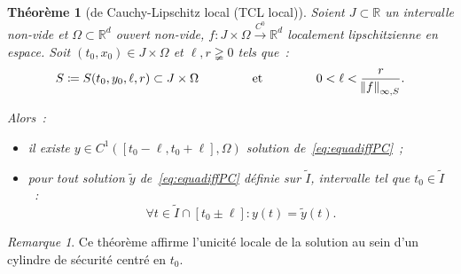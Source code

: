\documentclass{report}
\newtheorem{thm}{Théorème}[chapter]
\theoremstyle{definition}
\theoremstyle{remark}
\newtheorem*{rmq}{Remarque}
\numberwithin{equation}{section}
\newcommand{\R}{\mathbb R}
\newcommand{\toC}[1]{\xrightarrow{C^{#1}}}
\newcommand{\tocont}{\toC 0}
\begin{document}
			\begin{thm}[de Cauchy-Lipschitz local (TCL local)]Soient $J \subset \R$ un intervalle non-vide et $\Omega \subset \R^d$ ouvert non-vide,
			$f : J \times \Omega \tocont \R^d$ localement lipschitzienne en espace. Soit $(t_0, x_0) \in J \times \Omega$ et $\ell, r \gneqq 0$ tels que~:
			\begin{equation}
				S \coloneqq S(t_0, y_0, \ell, r) \subset J \times \Omega\qquad\qquad\text{ et }\qquad\qquad0 < \ell < \frac r{\norm f_{\infty, S}}.
			\end{equation}

			Alors~:
			\begin{itemize}
				\item il existe $y \in C^1\left([t_0-\ell, t_0+\ell], \Omega\right)$ solution de~\eqref{eq:equadiffPC}~;
				\item pour tout solution $\widetilde y$ de~\eqref{eq:equadiffPC} définie sur $\widetilde I$, intervalle tel que $t_0 \in \widetilde I$~:
				\begin{equation}
					\forall t \in \widetilde I \cap [t_0 \pm \ell] : y(t) = \widetilde y(t).
				\end{equation}
			\end{itemize}
			\end{thm}

			\begin{rmq} Ce théorème affirme l'unicité locale de la solution au sein d'un cylindre de sécurité centré en $t_0$.
			\end{rmq}
\end{document}
